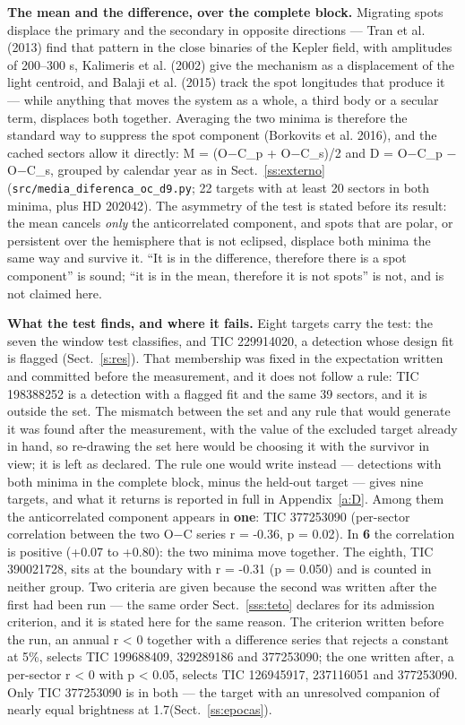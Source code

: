 \documentclass{aa}
\begin{document}
\textbf{The mean and the difference, over the complete block.} Migrating spots displace the primary and the secondary in opposite directions --- Tran et al. (2013) find that pattern in the close binaries of the Kepler field, with amplitudes of 200--300 s, Kalimeris et al. (2002) give the mechanism as a displacement of the light centroid, and Balaji et al. (2015) track the spot longitudes that produce it --- while anything that moves the system as a whole, a third body or a secular term, displaces both together. Averaging the two minima is therefore the standard way to suppress the spot component (Borkovits et al. 2016), and the cached sectors allow it directly: M = (O$-$C\_p + O$-$C\_s)/2 and D = O$-$C\_p $-$ O$-$C\_s, grouped by calendar year as in Sect.~\ref{ss:externo} (\texttt{src/\allowbreak media\_\allowbreak diferenca\_\allowbreak oc\_\allowbreak d9.py}; 22 targets with at least 20 sectors in both minima, plus HD 202042). The asymmetry of the test is stated before its result: the mean cancels \textit{only} the anticorrelated component, and spots that are polar, or persistent over the hemisphere that is not eclipsed, displace both minima the same way and survive it. ``It is in the difference, therefore there is a spot component'' is sound; ``it is in the mean, therefore it is not spots'' is not, and is not claimed here.

\textbf{What the test finds, and where it fails.} Eight targets carry the test: the seven the window test classifies, and TIC 229914020, a detection whose design fit is flagged (Sect.~\ref{s:res}). That membership was fixed in the expectation written and committed before the measurement, and it does not follow a rule: TIC 198388252 is a detection with a flagged fit and the same 39 sectors, and it is outside the set. The mismatch between the set and any rule that would generate it was found after the measurement, with the value of the excluded target already in hand, so re-drawing the set here would be choosing it with the survivor in view; it is left as declared. The rule one would write instead --- detections with both minima in the complete block, minus the held-out target --- gives nine targets, and what it returns is reported in full in Appendix~\ref{a:D}. Among them the anticorrelated component appears in \textbf{one}: TIC 377253090 (per-sector correlation between the two O$-$C series r = -0.36, p = 0.02). In \textbf{6} the correlation is positive (+0.07 to +0.80): the two minima move together. The eighth, TIC 390021728, sits at the boundary with r = -0.31 (p = 0.050) and is counted in neither group. Two criteria are given because the second was written after the first had been run --- the same order Sect.~\ref{sss:teto} declares for its admission criterion, and it is stated here for the same reason. The criterion written before the run, an annual r < 0 together with a difference series that rejects a constant at 5\%, selects TIC 199688409, 329289186 and 377253090; the one written after, a per-sector r < 0 with p < 0.05, selects TIC 126945917, 237116051 and 377253090. Only TIC 377253090 is in both --- the target with an unresolved companion of nearly equal brightness at 1.7\arcsec (Sect.~\ref{ss:epocas}).
\end{document}
